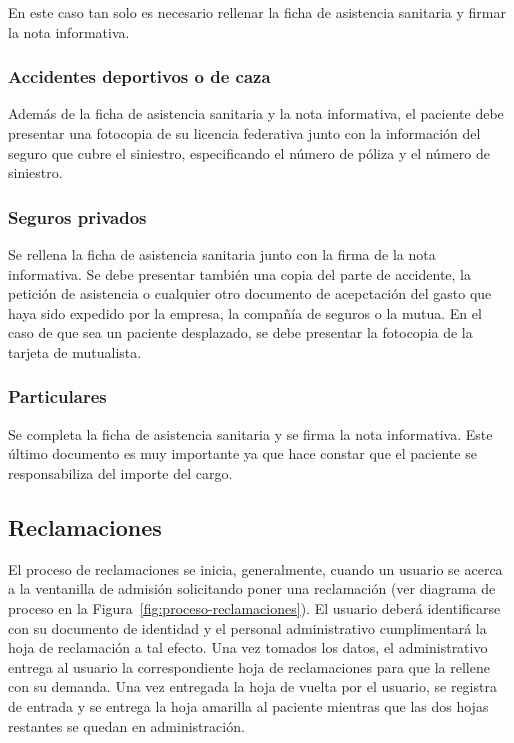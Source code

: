 En este caso tan solo es necesario rellenar la ficha de asistencia sanitaria y firmar la nota informativa.

\subsubsection{Accidentes deportivos o de caza}

Además de la ficha de asistencia sanitaria y la nota informativa, el paciente debe presentar una fotocopia de su licencia federativa junto con la información del seguro que cubre el siniestro, especificando el número de póliza y el número de siniestro.

\subsubsection{Seguros privados}

Se rellena la ficha de asistencia sanitaria junto con la firma de la nota informativa.
Se debe presentar también una copia del parte de accidente, la petición de asistencia o cualquier otro documento de acepctación del gasto que haya sido expedido por la empresa, la compañía de seguros o la mutua.
En el caso de que sea un paciente desplazado, se debe presentar la fotocopia de la tarjeta de mutualista.

\subsubsection{Particulares}

Se completa la ficha de asistencia sanitaria y se firma la nota informativa.
Este último documento es muy importante ya que hace constar que el paciente se responsabiliza del importe del cargo.

\subsection{Reclamaciones}

El proceso de reclamaciones se inicia, generalmente, cuando un usuario se acerca a la ventanilla de admisión solicitando poner una reclamación (ver diagrama de proceso en la Figura~\ref{fig:proceso-reclamaciones}).
El usuario deberá identificarse con su documento de identidad y el personal administrativo cumplimentará la hoja de reclamación a tal efecto.
Una vez tomados los datos, el administrativo entrega al usuario la correspondiente hoja de reclamaciones para que la rellene con su demanda.
Una vez entregada la hoja de vuelta por el usuario, se registra de entrada y se entrega la hoja amarilla al paciente mientras que las dos hojas restantes se quedan en administración.

